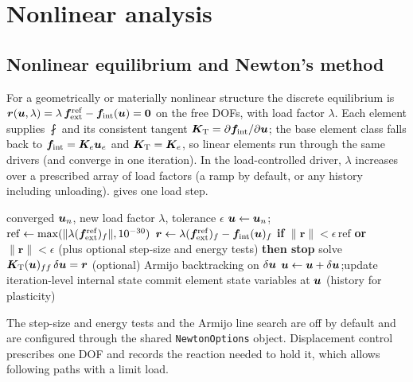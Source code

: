\section{Nonlinear analysis}\label{sec:nonlinear}

\subsection{Nonlinear equilibrium and Newton's method}
For a geometrically or materially nonlinear structure the discrete equilibrium is
$\bm r(\bm{u},\lambda)=\lambda\,\bm{f}_{\mathrm{ext}}^{\mathrm{ref}}-\bm{f}_{\mathrm{int}}(\bm{u})=\bm 0$ on the free DOFs, with load factor $\lambda$. Each element supplies $\fint$ and its consistent tangent
$\bm{K}_{\mathrm{T}}=\partial\bm{f}_{\mathrm{int}}/\partial\bm{u}$; the base element class falls back to $\bm{f}_{\mathrm{int}}=\bm{K}_e\bm{u}_e$ and $\bm{K}_{\mathrm{T}}=\bm{K}_e$, so linear elements run through the same drivers (and converge in one iteration).
In the load-controlled driver, $\lambda$ increases over a prescribed array of load factors (a ramp by default, or any history including unloading).  gives one load step.

\begin{algorithm}[t]
\caption{One load step of incremental Newton--Raphson}\label{alg:newton}
\begin{algorithmic}[1]
\Require converged $\bm{u}_n$, new load factor $\lambda$, tolerance $\epsilon$
\State $\bm{u}\gets\bm{u}_n$;\quad $\mathrm{ref}\gets\max(\|\lambda(\bm{f}_{\mathrm{ext}}^{\mathrm{ref}})_f\|,10^{-30})$
  \State $\bm r\gets\lambda(\bm{f}_{\mathrm{ext}}^{\mathrm{ref}})_f-\bm{f}_{\mathrm{int}}(\bm{u})_f$
  \State \textbf{if} $\|\bm r\|<\epsilon\,\mathrm{ref}$ \textbf{or} $\|\bm r\|<\epsilon$ (plus optional step-size and energy tests) \textbf{then stop}
  \State solve $\bm{K}_{\mathrm{T}}(\bm{u})_{ff}\,\delta\bm{u}=\bm r$
  \State (optional) Armijo backtracking on $\delta\bm{u}$
  \State $\bm{u}\gets\bm{u}+\delta\bm{u}$;\quad update iteration-level internal state
\EndFor
\State commit element state variables at $\bm{u}$ (history for plasticity)
\end{algorithmic}
\end{algorithm}

The step-size and energy tests and the Armijo line search are off by default and are configured through the shared \texttt{NewtonOptions} object. Displacement control prescribes one DOF
and records the reaction needed to hold it, which allows following paths with a limit load.

